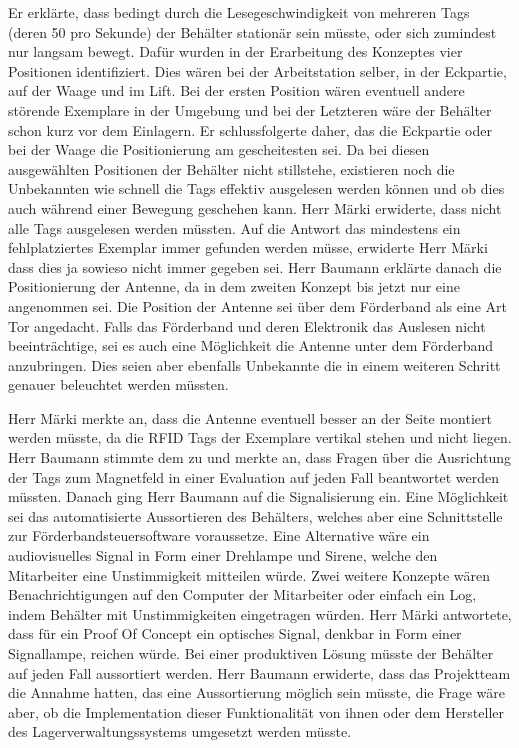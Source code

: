 \documentclass[parskip=full, a4paper]{scrreprt}
\begin{document}
Er erklärte, dass bedingt durch die Lesegeschwindigkeit von mehreren Tags (deren 50 pro Sekunde) der Behälter stationär sein müsste, oder sich zumindest nur langsam bewegt. Dafür wurden in der Erarbeitung des Konzeptes vier Positionen identifiziert. Dies wären bei der Arbeitstation selber, in der Eckpartie, auf der Waage und im Lift. Bei der ersten Position wären eventuell andere störende Exemplare in der Umgebung und bei der Letzteren wäre der Behälter schon kurz vor dem Einlagern.
Er schlussfolgerte daher, das die Eckpartie oder bei der Waage die Positionierung am gescheitesten sei. Da bei diesen ausgewählten Positionen der Behälter nicht stillstehe, existieren noch die Unbekannten wie schnell die Tags effektiv ausgelesen werden können und ob dies auch während einer Bewegung geschehen kann. Herr Märki erwiderte, dass nicht alle Tags ausgelesen werden müssten. Auf die Antwort das mindestens ein fehlplatziertes Exemplar immer gefunden werden müsse, erwiderte Herr Märki dass dies ja sowieso nicht immer gegeben sei.
Herr Baumann erklärte danach die Positionierung der Antenne, da in dem zweiten Konzept bis jetzt nur eine angenommen sei. Die Position der Antenne sei über dem Förderband als eine Art Tor angedacht. Falls das Förderband und deren Elektronik das Auslesen nicht beeinträchtige, sei es auch eine Möglichkeit die Antenne unter dem Förderband anzubringen. Dies seien aber ebenfalls Unbekannte die in einem weiteren Schritt genauer beleuchtet werden müssten.

Herr Märki merkte an, dass die Antenne eventuell besser an der Seite montiert werden müsste, da die RFID Tags der Exemplare vertikal stehen und nicht liegen. Herr Baumann stimmte dem zu und merkte an, dass Fragen über die Ausrichtung der Tags zum Magnetfeld in einer Evaluation auf jeden Fall beantwortet werden müssten.
Danach ging Herr Baumann auf die Signalisierung ein. Eine Möglichkeit sei das automatisierte Aussortieren des Behälters, welches aber eine Schnittstelle zur Förderbandsteuersoftware voraussetze. Eine Alternative wäre ein audiovisuelles Signal in Form einer Drehlampe und Sirene, welche den Mitarbeiter eine Unstimmigkeit mitteilen würde. Zwei weitere Konzepte wären Benachrichtigungen auf den Computer der Mitarbeiter oder einfach ein Log, indem Behälter mit Unstimmigkeiten eingetragen würden.
Herr Märki antwortete, dass für ein Proof Of Concept ein optisches Signal, denkbar in Form einer Signallampe, reichen würde. Bei einer produktiven Lösung müsste der Behälter auf jeden Fall aussortiert werden. Herr Baumann erwiderte, dass das Projektteam die Annahme hatten, das eine Aussortierung möglich sein müsste, die Frage wäre aber, ob die Implementation dieser Funktionalität von ihnen oder dem Hersteller des Lagerverwaltungssystems umgesetzt werden müsste.
\end{document}
